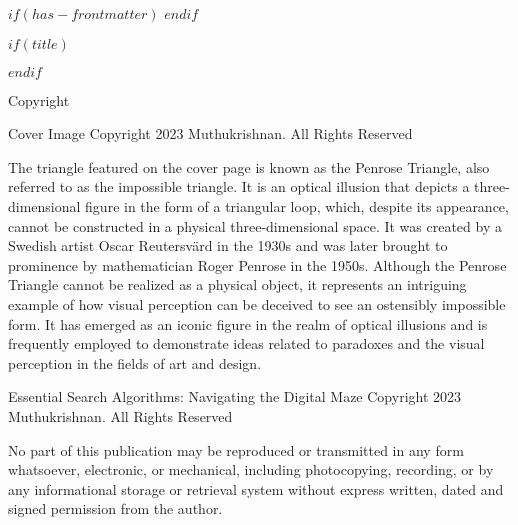 $if(has-frontmatter)$
\frontmatter
$endif$

$if(title)$
\maketitle
$endif$

\newpage


\begin{flushleft}
\Large Copyright
\end{flushleft}

\vspace*{\baselineskip}

\begin{flushleft}
\large Cover Image
\large Copyright 2023 Muthukrishnan. All Rights Reserved 
\end{flushleft}



\vspace{5mm} %

The triangle featured on the cover page is known as the Penrose Triangle, also referred to as the impossible triangle. It is an optical illusion that depicts a three-dimensional figure in the form of a triangular loop, which, despite its appearance, cannot be constructed in a physical three-dimensional space. It was created by a Swedish artist Oscar Reutersvärd in the 1930s and was later brought to prominence by mathematician Roger Penrose in the 1950s. Although the Penrose Triangle cannot be realized as a physical object, it represents an intriguing example of how visual perception can be deceived to see an ostensibly impossible form. It has emerged as an iconic figure in the realm of optical illusions and is frequently employed to demonstrate ideas related to paradoxes and the visual perception in the fields of art and design.


\vspace{5mm} %

\begin{flushleft}
\large Essential Search Algorithms: Navigating the Digital Maze
\large Copyright 2023 Muthukrishnan. All Rights Reserved
\end{flushleft}

\vspace{5mm} %

No part of this publication may be reproduced or transmitted in any form whatsoever, electronic, or mechanical, including photocopying, recording, or by any informational storage or retrieval system without express written, dated and signed permission from the author.

